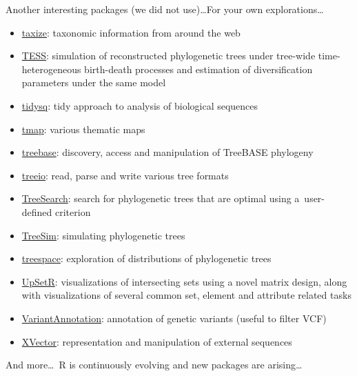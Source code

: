 \documentclass[compress, xelatex, 11pt, xcolor=svgnames, aspectratio=169,
	hyperref={
		bookmarks=true,
		unicode=true,
		colorlinks=true,
		pdftitle={Molecular data in R},
		plainpages=false,
		pdfauthor={Vojtech Zeisek},
		pdfsubject={Course about phylogeny and evolution in R},
		pdfcreator={XeLaTeX},
		pdfkeywords={R, evolution, phylogeny, molecular data},
		linkcolor=Crimson, %
		anchorcolor=Magenta, %
		citecolor=Magenta, %
		filecolor=Magenta, %
		menucolor=Magenta, %
		urlcolor=DodgerBlue, %
		},
	url={hyphens, lowtilde} %
	]{beamer}
\begin{document}
\begin{frame}[allowframebreaks]{Another interesting packages (we did not use)\ldots}{For your own explorations\ldots}
\begin{itemize}
		\item \href{https://CRAN.R-project.org/package=taxize}{taxize}: taxonomic information from around the web
		\item \href{https://CRAN.R-project.org/package=TESS}{TESS}: simulation of reconstructed phylogenetic trees under tree-wide time-heterogeneous birth-death processes and estimation of diversification parameters under the same model
		\item \href{https://CRAN.R-project.org/package=tidysq}{tidysq}: tidy approach to analysis of biological sequences
		\item \href{https://CRAN.R-project.org/package=tmap}{tmap}: various thematic maps
		\item \href{https://CRAN.R-project.org/package=treebase}{treebase}: discovery, access and manipulation of TreeBASE phylogeny
		\item \href{https://bioconductor.org/packages/release/bioc/html/treeio.html}{treeio}: read, parse and write various tree formats
		\item \href{https://CRAN.R-project.org/package=TreeSearch}{TreeSearch}: search for phylogenetic trees that are optimal using a~user-defined criterion
		\item \href{https://CRAN.R-project.org/package=TreeSim}{TreeSim}: simulating phylogenetic trees
		\item \href{https://CRAN.R-project.org/package=treespace}{treespace}: exploration of distributions of phylogenetic trees
		\item \href{https://CRAN.R-project.org/package=UpSetR}{UpSetR}: visualizations of intersecting sets using a novel matrix design, along with visualizations of several common set, element and attribute related tasks
		\item \href{https://bioconductor.org/packages/VariantAnnotation/}{VariantAnnotation}: annotation of genetic variants (useful to filter VCF)
		\item \href{https://bioconductor.org/packages/release/bioc/html/XVector.html}{XVector}: representation and manipulation of external sequences
	\end{itemize}
	And more\ldots~R is continuously evolving and new packages are arising\ldots
\end{frame}
\end{document}
